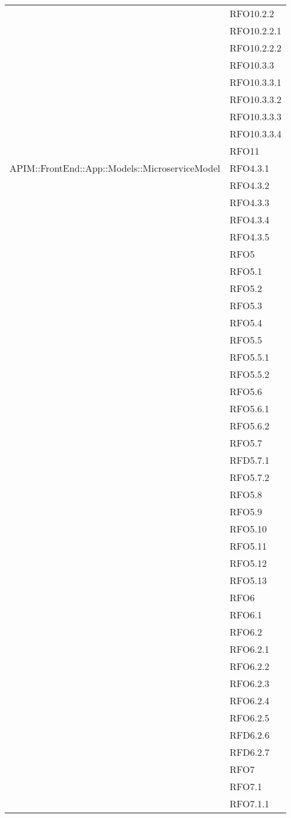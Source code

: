 \begin{longtable}{ p{12cm} | p{4cm} }
	& RFO10.2.2 \\
	& RFO10.2.2.1 \\
	& RFO10.2.2.2 \\
	& RFO10.3.3 \\
	& RFO10.3.3.1 \\
	& RFO10.3.3.2 \\
	& RFO10.3.3.3 \\
	& RFO10.3.3.4 \\
	& RFO11 \\
	\hline
	APIM::FrontEnd::App::Models::MicroserviceModel
	& RFO4.3.1 \\
	& RFO4.3.2 \\
	& RFO4.3.3 \\
	& RFO4.3.4 \\
	& RFO4.3.5 \\
	& RFO5 \\
	& RFO5.1 \\
	& RFO5.2 \\
	& RFO5.3 \\
	& RFO5.4 \\
	& RFO5.5 \\
	& RFO5.5.1 \\
	& RFO5.5.2 \\
	& RFO5.6 \\
	& RFO5.6.1 \\
	& RFO5.6.2 \\
	& RFO5.7 \\
	& RFD5.7.1 \\
	& RFO5.7.2 \\
	& RFO5.8 \\
	& RFO5.9 \\
	& RFO5.10 \\
	& RFO5.11 \\
	& RFO5.12 \\
	& RFO5.13 \\
	& RFO6 \\
	& RFO6.1 \\
	& RFO6.2 \\
	& RFO6.2.1 \\
	& RFO6.2.2 \\
	& RFO6.2.3 \\
	& RFO6.2.4 \\
	& RFO6.2.5 \\
	& RFD6.2.6 \\
	& RFD6.2.7 \\
	& RFO7 \\
	& RFO7.1 \\
	& RFO7.1.1 \\

\end{longtable}
